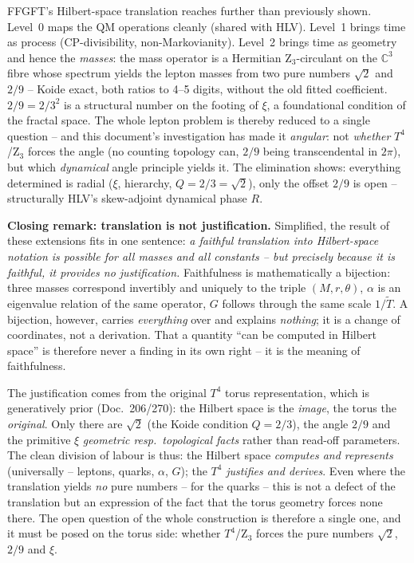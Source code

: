 \begin{conclusionBox}[Conclusion]
FFGFT's Hilbert-space translation reaches further than previously shown.
Level~0 maps the QM operations cleanly (shared with HLV). Level~1 brings time
as process (CP-divisibility, non-Markovianity). Level~2 brings time as geometry
and hence the \emph{masses}: the mass operator is a Hermitian Z$_3$-circulant
on the $\mathbb{C}^3$ fibre whose spectrum yields the lepton masses from two
pure numbers $\sqrt2$ and $2/9$ -- Koide exact, both ratios to 4--5 digits,
without the old fitted coefficient. $2/9=2/3^2$ is a structural number on the
footing of $\xi$, a foundational condition of the fractal space. The whole
lepton problem is thereby reduced to a single question -- and this document's
investigation has made it \emph{angular}: not \emph{whether} $T^4$/Z$_3$ forces
the angle (no counting topology can, $2/9$ being transcendental in $2\pi$), but
which \emph{dynamical} angle principle yields it. The elimination shows:
everything determined is radial ($\xi$, hierarchy, $Q=2/3=\sqrt2$), only the
offset $2/9$ is open -- structurally HLV's skew-adjoint dynamical phase $R$.
\end{conclusionBox}

\bigskip
\noindent\textbf{Closing remark: translation is not justification.}
Simplified, the result of these extensions fits in one sentence: \emph{a faithful
translation into Hilbert-space notation is possible for all masses and all
constants -- but precisely because it is faithful, it provides no
justification.} Faithfulness is mathematically a bijection: three masses
correspond invertibly and uniquely to the triple $(M,r,\theta)$, $\alpha$ is an
eigenvalue relation of the same operator, $G$ follows through the same scale
$1/\tilde T$. A bijection, however, carries \emph{everything} over and explains
\emph{nothing}; it is a change of coordinates, not a derivation. That a quantity
\enquote{can be computed in Hilbert space} is therefore never a finding in its
own right -- it is the meaning of faithfulness.

\smallskip
\noindent
The justification comes from the original $T^4$ torus representation, which is
generatively prior (Doc.~206/270): the Hilbert space is the \emph{image}, the
torus the \emph{original}. Only there are $\sqrt2$ (the Koide condition $Q=2/3$),
the angle $2/9$ and the primitive $\xi$ \emph{geometric resp.\ topological facts}
rather than read-off parameters. The clean division of labour is thus: the
Hilbert space \emph{computes and represents} (universally -- leptons, quarks,
$\alpha$, $G$); the $T^4$ \emph{justifies and derives}. Even where the
translation yields \emph{no} pure numbers -- for the quarks -- this is not a
defect of the translation but an expression of the fact that the torus geometry
forces none there. The open question of the whole construction is therefore a
single one, and it must be posed on the torus side: whether $T^4$/Z$_3$ forces
the pure numbers $\sqrt2$, $2/9$ and $\xi$.

